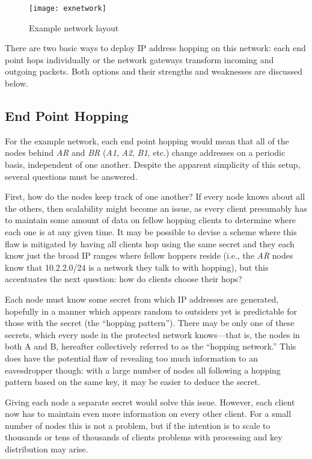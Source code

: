 \begin{figure}
	\centering
	\texttt{[image: exnetwork]}
	\caption{Example network layout}
	\label{fig:exnetwork}
\end{figure}

\par There are two basic ways to deploy IP address hopping on this network: each end point hops individually or the network gateways transform incoming and outgoing packets. Both options and their strengths and weaknesses are discussed below.

\subsection{End Point Hopping}
\par For the example network, each end point hopping would mean that all of the nodes behind \textit{AR} and \textit{BR} (\textit{A1}, \textit{A2}, \textit{B1}, etc.) change addresses on a periodic basis, independent of one another. Despite the apparent simplicity of this setup, several questions must be answered.

\par First, how do the nodes keep track of one another? If every node knows about all the others, then scalability might become an issue, as every client presumably has to maintain some amount of data on fellow hopping clients to determine where each one is at any given time. It may be possible to devise a scheme where this flaw is mitigated by having all clients hop using the same secret and they each know just the broad IP ranges where fellow hoppers reside (i.e., the \textit{AR} nodes know that 10.2.2.0/24 is a network they talk to with hopping), but this accentuates the next question: how do clients choose their hops?

\par Each node must know some secret from which \ac{IP} addresses are generated, hopefully in a manner which appears random to outsiders yet is predictable for those with the secret (the ``hopping pattern''). There may be only one of these secrets, which every node in the protected network knows---that is, the nodes in both A and B, hereafter collectively referred to as the ``hopping network.'' This does have the potential flaw of revealing too much information to an eavesdropper though: with a large number of nodes all following a hopping pattern based on the same key, it may be easier to deduce the secret.

\par Giving each node a separate secret would solve this issue. However, each client now has to maintain even more information on every other client. For a small number of nodes this is not a problem, but if the intention is to scale to thousands or tens of thousands of clients problems with processing and key distribution may arise.  

